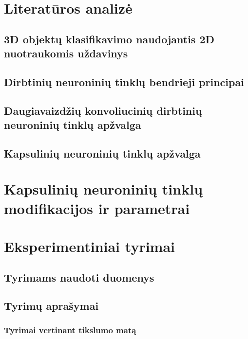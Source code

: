 \documentclass{VUMIFInfMagistrinis}
\begin{document}
\section{Literatūros analizė}

\subsection{3D objektų klasifikavimo naudojantis 2D nuotraukomis uždavinys}


\subsection{Dirbtinių neuroninių tinklų bendrieji principai}




\subsection{Daugiavaizdžių konvoliucinių dirbtinių neuroninių tinklų apžvalga}




\subsection{Kapsulinių neuroninių tinklų apžvalga}


\section{Kapsulinių neuroninių tinklų modifikacijos ir parametrai}


\section{Eksperimentiniai tyrimai}

\subsection{Tyrimams naudoti duomenys}


\subsection{Tyrimų aprašymai}

\subsubsection{Tyrimai vertinant tikslumo matą}

\end{document}
